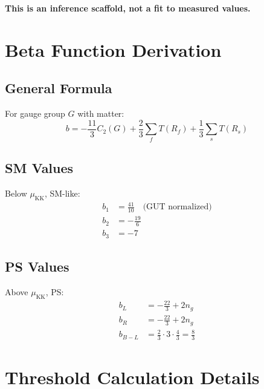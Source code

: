 \documentclass[11pt,a4paper]{article}
\begin{document}
\textbf{This is an inference scaffold, not a fit to measured values.}

\appendix

\section{Beta Function Derivation}
\label{app:beta}

\subsection{General Formula}
\label{app:beta-general}

For gauge group $G$ with matter:
\begin{equation}
\label{eq:beta-app}
b = -\frac{11}{3}C_2(G) + \frac{2}{3}\sum_f T(R_f) + \frac{1}{3}\sum_s T(R_s)
\end{equation}

\subsection{SM Values}
\label{app:sm-beta}

Below $\mu_{\text{KK}}$, SM-like:
\begin{align}
\label{eq:b1-sm}
b_1 &= \frac{41}{10} \quad \text{(GUT normalized)} \\
\label{eq:b2-sm}
b_2 &= -\frac{19}{6} \\
\label{eq:b3-sm}
b_3 &= -7
\end{align}

\subsection{PS Values}
\label{app:ps-beta}

Above $\mu_{\text{KK}}$, PS:
\begin{align}
\label{eq:bL-ps}
b_L &= -\frac{22}{3} + 2n_g \\
\label{eq:bR-ps}
b_R &= -\frac{22}{3} + 2n_g \\
\label{eq:bBL-ps}
b_{B-L} &= \frac{2}{3}\cdot 3 \cdot \frac{4}{3} = \frac{8}{3}
\end{align}

\section{Threshold Calculation Details}
\label{app:threshold-detail}
\end{document}

